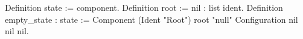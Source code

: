 Definition state := component.
Definition root := nil : list ident.
Definition empty_state : state :=  
      Component (Ident "Root") root "null" Configuration nil nil nil.
